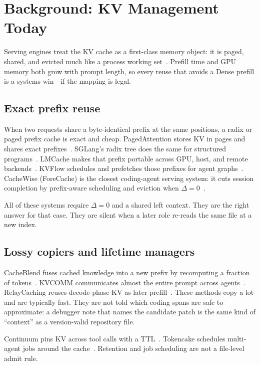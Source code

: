 \section{Background: KV Management Today}
\label{sec:background}

Serving engines treat the KV cache as a first-class memory object: it is
paged, shared, and evicted much like a process working
set~\cite{kwon2023efficient,sglang2024}. Prefill time and GPU memory both
grow with prompt length, so every reuse that avoids a Dense prefill is a
systems win---if the mapping is legal.

\subsection{Exact prefix reuse}

When two requests share a byte-identical prefix at the same positions, a
radix or paged prefix cache is exact and cheap.
PagedAttention stores KV in pages and shares exact
prefixes~\cite{kwon2023efficient}. SGLang's radix tree does the same for
structured programs~\cite{sglang2024}. LMCache makes that prefix portable
across GPU, host, and remote backends~\cite{liu2025lmcache}. KVFlow
schedules and prefetches those prefixes for agent
graphs~\cite{pan2025kvflow}. CacheWise (ForeCache) is the closest
coding-agent serving system: it cuts session completion by prefix-aware
scheduling and eviction when $\Delta{=}0$~\cite{tiwari2026cachewise}.

All of these systems require $\Delta = 0$ and a shared left context.
They are the right answer for that case. They are silent when a later
role re-reads the same file at a new index.

\subsection{Lossy copiers and lifetime managers}

CacheBlend fuses cached knowledge into a new prefix by recomputing a
fraction of tokens~\cite{yao2024cacheblend}. KVCOMM communicates almost
the entire prompt across agents~\cite{ye2024kvcomm}. RelayCaching reuses
decode-phase KV as later prefill~\cite{relaycaching}. These methods copy
a lot and are typically fast. They are not told which coding spans are
safe to approximate: a debugger note that names the candidate patch is
the same kind of ``context'' as a version-valid repository file.

Continuum pins KV across tool calls with a TTL~\cite{continuum}.
Tokencake schedules multi-agent jobs around the
cache~\cite{tokencake2025}. Retention and job scheduling are not a
file-level admit rule.

